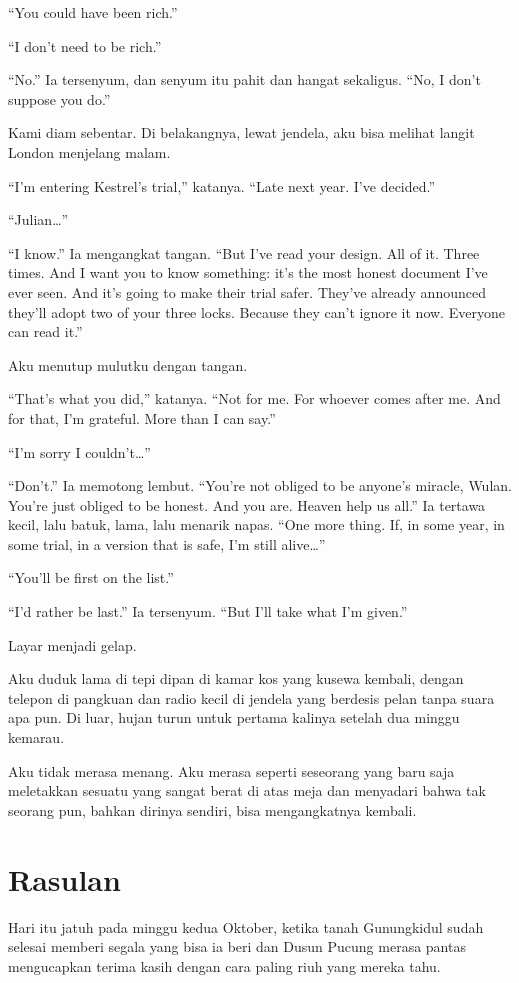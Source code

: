 \documentclass[11pt,twoside,openany]{book}
\begin{document}
``You could have been rich.''

``I don't need to be rich.''

``No.'' Ia tersenyum, dan senyum itu pahit dan hangat sekaligus. ``No, I don't suppose you do.''

Kami diam sebentar. Di belakangnya, lewat jendela, aku bisa melihat langit London menjelang malam.

``I'm entering Kestrel's trial,'' katanya. ``Late next year. I've decided.''

``Julian\ldots{}''

``I know.'' Ia mengangkat tangan. ``But I've read your design. All of it. Three times. And I want you to know something: it's the most honest document I've ever seen. And it's going to make their trial safer. They've already announced they'll adopt two of your three locks. Because they can't ignore it now. Everyone can read it.''

Aku menutup mulutku dengan tangan.

``That's what you did,'' katanya. ``Not for me. For whoever comes after me. And for that, I'm grateful. More than I can say.''

``I'm sorry I couldn't\ldots{}''

``Don't.'' Ia memotong lembut. ``You're not obliged to be anyone's miracle, Wulan. You're just obliged to be honest. And you are. Heaven help us all.'' Ia tertawa kecil, lalu batuk, lama, lalu menarik napas. ``One more thing. If, in some year, in some trial, in a version that is safe, I'm still alive\ldots{}''

``You'll be first on the list.''

``I'd rather be last.'' Ia tersenyum. ``But I'll take what I'm given.''

Layar menjadi gelap.

Aku duduk lama di tepi dipan di kamar kos yang kusewa kembali, dengan telepon di pangkuan dan radio kecil di jendela yang berdesis pelan tanpa suara apa pun. Di luar, hujan turun untuk pertama kalinya setelah dua minggu kemarau.

Aku tidak merasa menang. Aku merasa seperti seseorang yang baru saja meletakkan sesuatu yang sangat berat di atas meja dan menyadari bahwa tak seorang pun, bahkan dirinya sendiri, bisa mengangkatnya kembali.

\chapter{Rasulan}
Hari itu jatuh pada minggu kedua Oktober, ketika tanah Gunungkidul sudah selesai memberi segala yang bisa ia beri dan Dusun Pucung merasa pantas mengucapkan terima kasih dengan cara paling riuh yang mereka tahu.
\end{document}
